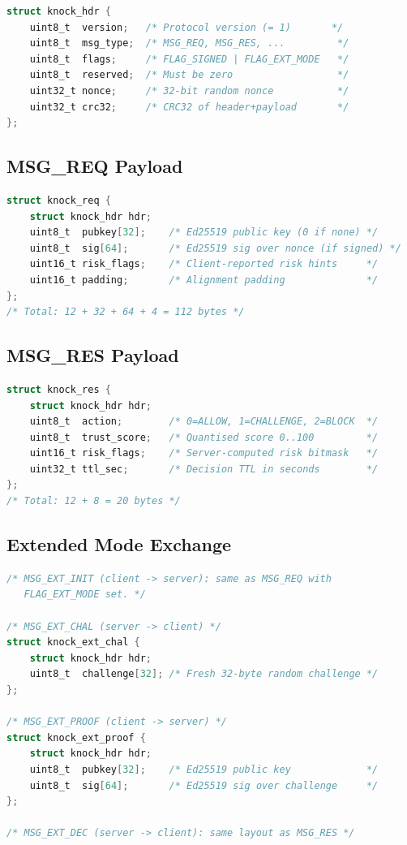 \documentclass[10pt,conference]{IEEEtran}
\begin{document}
\begin{lstlisting}[language=C,caption={KNOCK v2.0 common header (C struct).}]
struct knock_hdr {
    uint8_t  version;   /* Protocol version (= 1)       */
    uint8_t  msg_type;  /* MSG_REQ, MSG_RES, ...         */
    uint8_t  flags;     /* FLAG_SIGNED | FLAG_EXT_MODE   */
    uint8_t  reserved;  /* Must be zero                  */
    uint32_t nonce;     /* 32-bit random nonce           */
    uint32_t crc32;     /* CRC32 of header+payload       */
};
\end{lstlisting}

\subsection{MSG\_REQ Payload}

\begin{lstlisting}[language=C,caption={MSG\_REQ additional payload.}]
struct knock_req {
    struct knock_hdr hdr;
    uint8_t  pubkey[32];    /* Ed25519 public key (0 if none) */
    uint8_t  sig[64];       /* Ed25519 sig over nonce (if signed) */
    uint16_t risk_flags;    /* Client-reported risk hints     */
    uint16_t padding;       /* Alignment padding              */
};
/* Total: 12 + 32 + 64 + 4 = 112 bytes */
\end{lstlisting}

\subsection{MSG\_RES Payload}

\begin{lstlisting}[language=C,caption={MSG\_RES server response.}]
struct knock_res {
    struct knock_hdr hdr;
    uint8_t  action;        /* 0=ALLOW, 1=CHALLENGE, 2=BLOCK  */
    uint8_t  trust_score;   /* Quantised score 0..100         */
    uint16_t risk_flags;    /* Server-computed risk bitmask   */
    uint32_t ttl_sec;       /* Decision TTL in seconds        */
};
/* Total: 12 + 8 = 20 bytes */
\end{lstlisting}

\subsection{Extended Mode Exchange}

\begin{lstlisting}[language=C,caption={Extended mode messages.}]
/* MSG_EXT_INIT (client -> server): same as MSG_REQ with
   FLAG_EXT_MODE set. */

/* MSG_EXT_CHAL (server -> client) */
struct knock_ext_chal {
    struct knock_hdr hdr;
    uint8_t  challenge[32]; /* Fresh 32-byte random challenge */
};

/* MSG_EXT_PROOF (client -> server) */
struct knock_ext_proof {
    struct knock_hdr hdr;
    uint8_t  pubkey[32];    /* Ed25519 public key             */
    uint8_t  sig[64];       /* Ed25519 sig over challenge     */
};

/* MSG_EXT_DEC (server -> client): same layout as MSG_RES */
\end{lstlisting}
\end{document}
